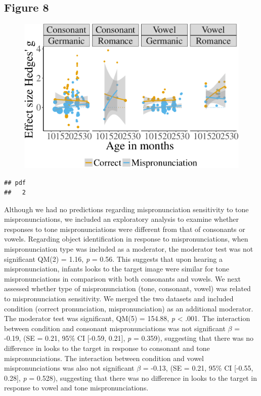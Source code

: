\documentclass[man]{apa6}
\theoremstyle{definition}
\theoremstyle{definition}
\theoremstyle{definition}
\theoremstyle{remark}
\begin{document}
\subsection{Figure 8}\label{figure-8}

\begin{figure}[htbp]
\centering
\includegraphics{Paper_Analyses_files/figure-latex/PlotCVEffect_cond_age_fam-1.pdf}
\caption{}
\end{figure}

\begin{verbatim}
## pdf 
##   2
\end{verbatim}

Although we had no predictions regarding mispronunciation sensitivity to
tone mispronunciations, we included an exploratory analysis to examine
whether responses to tone mispronunciations were different from that of
consonants or vowels. Regarding object identification in response to
mispronunciations, when mispronunciation type was included as a
moderator, the moderator test was not significant QM(2) = 1.16, \emph{p}
= 0.56. This suggests that upon hearing a mispronunciation, infants
looks to the target image were similar for tone mispronunciations in
comparison with both consonants and vowels. We next assessed whether
type of mispronunciation (tone, consonant, vowel) was related to
mispronunciation sensitivity. We merged the two datasets and included
condition (correct pronunciation, mispronunciation) as an additional
moderator. The moderator test was significant, QM(5) = 154.88, \emph{p}
\textless{} .001. The interaction between condition and consonant
mispronunciations was not significant \(\beta\) = -0.19, (SE = 0.21,
95\% CI {[}-0.59, 0.21{]}, \emph{p} = 0.359), suggesting that there was
no difference in looks to the target in response to consonant and tone
mispronunciations. The interaction between condition and vowel
mispronunciations was also not significant \(\beta\) = -0.13, (SE =
0.21, 95\% CI {[}-0.55, 0.28{]}, \emph{p} = 0.528), suggesting that
there was no difference in looks to the target in response to vowel and
tone mispronunciations.
\end{document}
